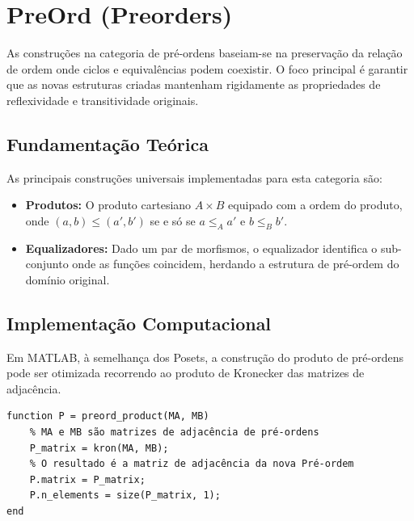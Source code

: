 \section{PreOrd (Preorders)}
As construções na categoria de pré-ordens baseiam-se na preservação da relação de ordem onde ciclos e equivalências podem coexistir. O foco principal é garantir que as novas estruturas criadas mantenham rigidamente as propriedades de reflexividade e transitividade originais.

\subsection{Fundamentação Teórica}
As principais construções universais implementadas para esta categoria são:
\begin{itemize}
    \item \textbf{Produtos:} O produto cartesiano $A \times B$ equipado com a ordem do produto, onde $(a,b) \le (a',b')$ se e só se $a \le_A a'$ e $b \le_B b'$.
    \item \textbf{Equalizadores:} Dado um par de morfismos, o equalizador identifica o sub-conjunto onde as funções coincidem, herdando a estrutura de pré-ordem do domínio original.
\end{itemize}

\subsection{Implementação Computacional}
Em MATLAB, à semelhança dos Posets, a construção do produto de pré-ordens pode ser otimizada recorrendo ao produto de Kronecker das matrizes de adjacência.

\begin{lstlisting}[caption={Construção do Produto de Pré-ordens}]
function P = preord_product(MA, MB)
    % MA e MB são matrizes de adjacência de pré-ordens
    P_matrix = kron(MA, MB);
    % O resultado é a matriz de adjacência da nova Pré-ordem
    P.matrix = P_matrix;
    P.n_elements = size(P_matrix, 1);
end
\end{lstlisting}